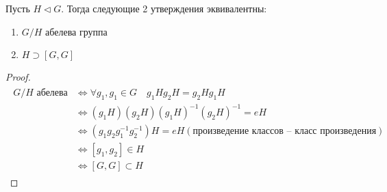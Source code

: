 \begin{theorem-non}
    Пусть $H \lhd G$. 
    Тогда следующие 2 утверждения эквивалентны: 
    \begin{enumerate}
        \item $G / H$ абелева группа
        \item $H \supset [G, G]$
    \end{enumerate}
\end{theorem-non}
\begin{proof} \quad \\
    \begin{gather*}
        \begin{split}
            \text{$G / H$ абелева} 
            &\Leftrightarrow \forall g_1, g_1 \in G \quad g_1Hg_2H = g_2Hg_1H \\
            &\Leftrightarrow (g_1H)(g_2H)(g_1H)^{-1}(g_2H)^{-1} = eH  \\
            &\Leftrightarrow (g_1g_2g_1^{-1}g_2^{-1})H = eH (\text{произведение классов -- класс произведения})\\
            &\Leftrightarrow [g_1, g_2] \in H \\
            &\Leftrightarrow [G, G] \subset H
        \end{split}
    \end{gather*}
\end{proof}